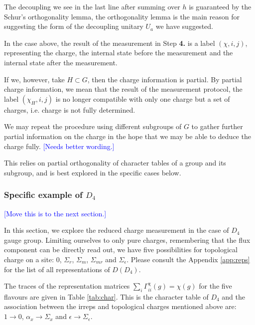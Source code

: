 \documentclass[two column]{article}
\newcommand{\jovan}[1]{\textcolor{blue}{[#1]}}
\begin{document}
The decoupling we see in the last line after summing over $h$ is guaranteed by the Schur's orthogonality lemma, the orthogonality lemma is the main reason for suggesting the form of the decoupling unitary $U_a$ we have suggested.

In the case above, the result of the measurement in Step \textbf{4.} is a label $(\chi, i, j)$, representing the charge, the internal state before the measurement and the internal state after the measurement.

If we, however, take $H \subset G$, then the charge information is partial.
By partial charge information, we mean that the result of the measurement protocol, the label $(\chi_H, i, j)$ is no longer compatible with only one charge but a set of charges, i.e. charge is not fully determined.

We may repeat the procedure using different subgroups of $G$ to gather further partial information on the charge in the hope that we may be able to deduce the charge fully. \jovan{Needs better wording.}

This relies on partial orthogonality of character tables of a group and its subgroup, and is best explored in the specific cases below.

\subsubsection{Specific example of $D_4$}

\jovan{Move this is to the next section.}

In this section, we explore the reduced charge measurement in the case of $D_4$ gauge group.
Limiting ourselves to only pure charges, remembering that the flux component can be directly read out, we have five possibilities for topological charge on a site: $0$, $\Sigma_r$, $\Sigma_m$, $\Sigma_{mr}$ and $\Sigma_{\epsilon}$. Please consult the Appendix \ref{app:reps} for the list of all representations of $D(D_4)$.

The traces of the representation matrices $\sum_i\Gamma^\chi_{ii}(g) = \chi(g)$ for the five flavours are given in Table \ref{tab:char}. This is the character table of $D_4$ and the association between the irreps and topological charges mentioned above are: $1 \rightarrow 0$, $\alpha_x \rightarrow \Sigma_x$ and $\epsilon \rightarrow \Sigma_\epsilon$.
\end{document}
